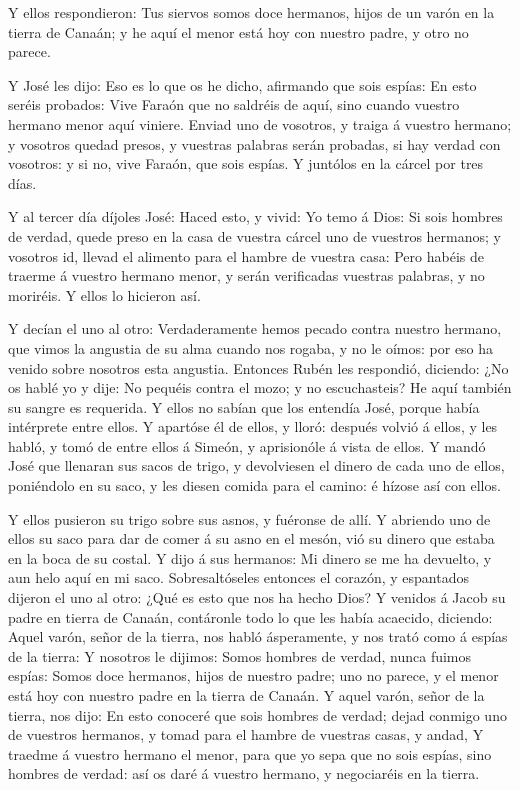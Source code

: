  Y ellos respondieron: Tus siervos somos doce hermanos,
hijos de un varón en la tierra de Canaán; y he aquí el menor está hoy
con nuestro padre, y otro no parece.

 Y José les dijo: Eso es lo que os he dicho, afirmando que
sois espías:  En esto seréis probados: Vive Faraón que no
saldréis de aquí, sino cuando vuestro hermano menor aquí viniere.
 Enviad uno de vosotros, y traiga á vuestro hermano; y
vosotros quedad presos, y vuestras palabras serán probadas, si hay
verdad con vosotros: y si no, vive Faraón, que sois espías.
 Y juntólos en la cárcel por tres días.

 Y al tercer día díjoles José: Haced esto, y vivid: Yo temo
á Dios:  Si sois hombres de verdad, quede preso en la casa
de vuestra cárcel uno de vuestros hermanos; y vosotros id, llevad el
alimento para el hambre de vuestra casa:  Pero habéis de
traerme á vuestro hermano menor, y serán verificadas vuestras palabras,
y no moriréis. Y ellos lo hicieron así.

 Y decían el uno al otro: Verdaderamente hemos pecado
contra nuestro hermano, que vimos la angustia de su alma cuando nos
rogaba, y no le oímos: por eso ha venido sobre nosotros esta angustia.
 Entonces Rubén les respondió, diciendo: ¿No os hablé yo y
dije: No pequéis contra el mozo; y no escuchasteis? He aquí también su
sangre es requerida.  Y ellos no sabían que los entendía
José, porque había intérprete entre ellos.  Y apartóse él
de ellos, y lloró: después volvió á ellos, y les habló, y tomó de entre
ellos á Simeón, y aprisionóle á vista de ellos.  Y mandó
José que llenaran sus sacos de trigo, y devolviesen el dinero de cada
uno de ellos, poniéndolo en su saco, y les diesen comida para el camino:
é hízose así con ellos.

 Y ellos pusieron su trigo sobre sus asnos, y fuéronse de
allí.  Y abriendo uno de ellos su saco para dar de comer á
su asno en el mesón, vió su dinero que estaba en la boca de su costal.
 Y dijo á sus hermanos: Mi dinero se me ha devuelto, y aun
helo aquí en mi saco. Sobresaltóseles entonces el corazón, y espantados
dijeron el uno al otro: ¿Qué es esto que nos ha hecho Dios?
 Y venidos á Jacob su padre en tierra de Canaán, contáronle
todo lo que les había acaecido, diciendo:  Aquel varón,
señor de la tierra, nos habló ásperamente, y nos trató como á espías de
la tierra:  Y nosotros le dijimos: Somos hombres de verdad,
nunca fuimos espías:  Somos doce hermanos, hijos de nuestro
padre; uno no parece, y el menor está hoy con nuestro padre en la tierra
de Canaán.  Y aquel varón, señor de la tierra, nos dijo: En
esto conoceré que sois hombres de verdad; dejad conmigo uno de vuestros
hermanos, y tomad para el hambre de vuestras casas, y andad,
 Y traedme á vuestro hermano el menor, para que yo sepa que
no sois espías, sino hombres de verdad: así os daré á vuestro hermano, y
negociaréis en la tierra.

